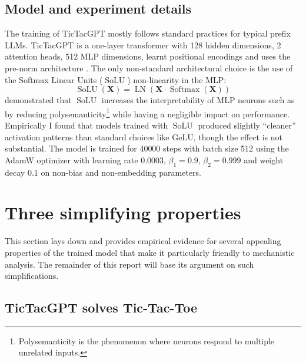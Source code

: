 \documentclass{article}
\newcommand{\ttgpt}{TicTacGPT\xspace}
\newcommand{\ttt}{Tic-Tac-Toe\xspace}
\newcommand{\m}[1]{\mathbf{\bm{#1}}}
\DeclareMathOperator{\softmax}{Softmax}
\DeclareMathOperator{\solu}{SoLU}
\DeclareMathOperator{\layernorm}{LN}
\begin{document}
\subsection{Model and experiment details}

The training of \ttgpt mostly follows standard practices \citep{radford2019language} for typical prefix \ac{LLMs}. \ttgpt is a one-layer transformer with 128 hidden dimensions, 2 attention heads, 512 MLP dimensions, learnt positional encodings and uses the pre-norm architecture \citep{xiong2020layer}. The only non-standard architectural choice is the use of the Softmax Linear Units ($\solu$) \citep{elhage2022solu} non-linearity in the MLP:
\begin{equation*}
    \solu(\m{X}) = \layernorm(\m{X} \cdot \softmax(\m{X}))
\end{equation*}
\citet{elhage2022solu} demonstrated that $\solu$ increases the interpretability of MLP neurons such as by reducing polysemanticity\footnote{Polysemanticity is the phenomenon where neurons respond to multiple unrelated inputs.}\citep{olah2020zoom} while having a negligible impact on performance. Empirically I found that models trained with $\solu$ produced slightly ``cleaner'' activation patterns than standard choices like $\text{GeLU}$, though the effect is not substantial. The model is trained for 40000 steps with batch size 512 using the AdamW optimizer \citep{loshchilov2017decoupled} with learning rate $0.0003$, $\beta_1 = 0.9$, $\beta_2 = 0.999$ and weight decay $0.1$ on non-bias and non-embedding parameters.

\section{Three simplifying properties} \label{sec:simplify}

This section lays down and provides empirical evidence for several appealing properties of the trained model that make it particularly friendly to mechanistic analysis. The remainder of this report will base its argument on such simplifications.

\subsection{\ttgpt solves \ttt}


\end{document}
